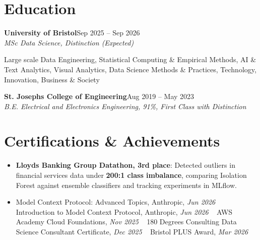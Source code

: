 \documentclass[a4paper,11pt]{article}
\newcommand{\roleNoLoc}[3]{\textbf{#1}\hfill{\color{muted}#2}\\ \textit{#3}\par}
\newcommand{\gap}{\vspace{5pt}}
\newcommand{\num}[1]{\textbf{#1}}   %
\begin{document}
\section{Education}
\roleNoLoc{University of Bristol}{Sep 2025 – Sep 2026}{MSc Data Science, Distinction \textit{(Expected)}}
{\color{muted}\small Large scale Data Engineering, Statistical Computing \& Empirical Methods, AI \& Text Analytics, Visual Analytics, Data Science Methods \& Practices, Technology, Innovation, Business \& Society}\par
\gap
{}
\roleNoLoc{St. Joseph\textquotesingle{}s College of Engineering}{Aug 2019 – May 2023}{B.E. Electrical and Electronics Engineering, 91\%, First Class with Distinction}

\section{Certifications \& Achievements}
\begin{itemize}
  \item \textbf{Lloyd\textquotesingle{}s Banking Group Datathon, 3rd place}: Detected outliers in financial services data under \num{200:1 class imbalance}, comparing Isolation Forest against ensemble classifiers and tracking experiments in MLflow.
  \item Model Context Protocol: Advanced Topics, Anthropic, \textit{Jun 2026}\nobreak\ \,\textperiodcentered\, Introduction to Model Context Protocol, Anthropic, \textit{Jun 2026}\nobreak\ \,\textperiodcentered\, AWS Academy Cloud Foundations, \textit{Nov 2025}\nobreak\ \,\textperiodcentered\, 180 Degrees Consulting Data Science Consultant Certificate, \textit{Dec 2025}\nobreak\ \,\textperiodcentered\, Bristol PLUS Award, \textit{Mar 2026}
\end{itemize}
\end{document}
